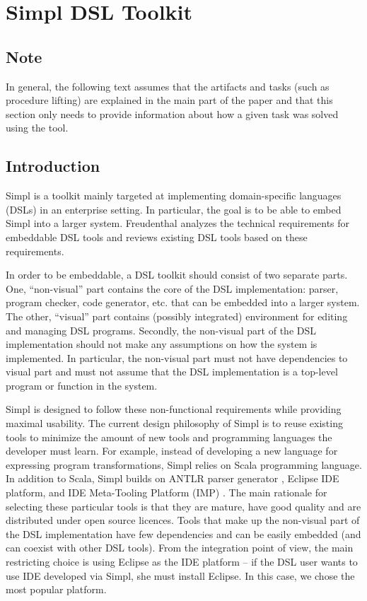 \section{Simpl DSL Toolkit}


\subsection{Note}

In general, the following text assumes that the artifacts and tasks
(such as procedure lifting) are explained in the main part of the
paper and that this section only needs to provide information about
how a given task was solved using the tool.


\subsection{Introduction}

Simpl is a toolkit mainly targeted at implementing domain-specific
languages (DSLs) in an enterprise setting. In particular, the goal
is to be able to embed Simpl into a larger system. Freudenthal \cite{enterprise-dsl}
analyzes the technical requirements for embeddable DSL tools and reviews
existing DSL tools based on these requirements.

In order to be embeddable, a DSL toolkit should consist of two separate
parts. One, {}``non-visual'' part contains the core of the DSL implementation:
parser, program checker, code generator, etc. that can be embedded
into a larger system. The other, {}``visual'' part contains (possibly
integrated) environment for editing and managing DSL programs. Secondly,
the non-visual part of the DSL implementation should not make any
assumptions on how the system is implemented. In particular, the non-visual
part must not have dependencies to visual part and must not assume
that the DSL implementation is a top-level program or function in
the system.

Simpl is designed to follow these non-functional requirements while
providing maximal usability. The current design philosophy of Simpl
is to reuse existing tools to minimize the amount of new tools and
programming languages the developer must learn. For example, instead
of developing a new language for expressing program transformations,
Simpl relies on Scala programming language. In addition to Scala,
Simpl builds on ANTLR parser generator \cite{antlr}, Eclipse IDE
platform, and IDE Meta-Tooling Platform (IMP) \cite{imp}. The main
rationale for selecting these particular tools is that they are mature,
have good quality and are distributed under open source licences.
Tools that make up the non-visual part of the DSL implementation have
few dependencies and can be easily embedded (and can coexist with
other DSL tools). From the integration point of view, the main restricting
choice is using Eclipse as the IDE platform -- if the DSL user wants
to use IDE developed via Simpl, she must install Eclipse. In this
case, we chose the most popular platform.

